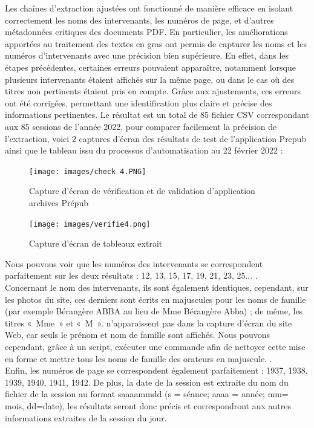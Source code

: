 Les chaînes d'extraction ajustées ont fonctionné de manière efficace en isolant correctement les noms des intervenants, les numéros de page, et d'autres métadonnées critiques des documents \gls{PDF}. En particulier, les améliorations apportées au traitement des textes en gras ont permis de capturer les noms et les numéros d'intervenants avec une précision bien supérieure. En effet, dans les étapes précédentes, certaines erreurs pouvaient apparaître, notamment lorsque plusieurs intervenants étaient affichés sur la même page, ou dans le cas où des titres non pertinents étaient pris en compte. Grâce aux ajustements, ces erreurs ont été corrigées, permettant une identification plus claire et précise des informations pertinentes.
Le résultat est un total de 85 fichier \gls{CSV} correspondant aux 85 sessions de l'année 2022, pour comparer facilement la précision de l'extraction, voici 2 captures d'écran des résultats de test de l'application \gls{Prepub} ainsi que le tableau issu du processus d'automatisation au 22 février 2022 :

\begin{figure}[H]
    \centering
    \texttt{[image: images/check 4.PNG]}
    \caption{Capture d'écran de vérification et de validation d'application archives Prépub}
\end{figure}

\begin{figure}[H]
    \centering
    \texttt{[image: images/verifie4.png]}
    \caption{Capture d'écran de tableaux extrait}
\end{figure}

Nous pouvons voir que les numéros des intervenants se correspondent parfaitement sur les deux résultats : 12, 13, 15, 17, 19, 21, 23, 25... .\\
Concernant le nom des intervenants, ils sont également identiques, cependant, sur les photos du site, ces derniers sont écrits en majuscules pour les noms de famille (par exemple Bérangère ABBA au lieu de Mme Bérangère Abba) ; de même, les titres « Mme » et « M ». n'apparaissent pas dans la capture d'écran du site Web, car seuls le prénom et nom de famille sont affichés. Nous pouvons cependant, grâce à un script, exécuter une commande afin de nettoyer cette mise en forme et mettre tous les noms de famille des orateurs en majuscule. .\\
Enfin, les numéros de page se correspondent également parfaitement : 1937, 1938, 1939, 1940, 1941, 1942. De plus, la date de la session est extraite du nom du fichier de la session au format saaaammdd (s = séance; aaaa = année; mm= mois, dd=date), les résultats seront donc précis et correspondront aux autres informations extraites de la session du jour.

